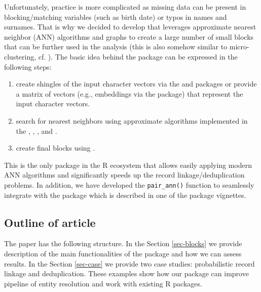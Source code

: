 Unfortunately, practice is more complicated as missing data can be
present in blocking/matching variables (such as birth date) or typos in
names and surnames. That is why we decided to develop 
that leverages approximate nearest neighbor (ANN) algorithms and graphs
to create a large number of small blocks that can be further used in the
analysis (this is also somehow similar to micro-clustering, cf.
\citet{johndrow2018theoretical}). The basic idea behind the 
package can be expressed in the following steps:

\begin{enumerate}
\def\labelenumi{\arabic{enumi}.}
\tightlist
\item
  create shingles of the input character vectors via the
   \citep{tokenizers} and 
  \citep{text2vec} packages or provide a matrix of vectors (e.g.,
  embeddings via the  \citep{ragnar} package) that
  represent the input character vectors.
\item
  search for nearest neighbors using approximate algorithms
  implemented in the  \citep{rnndescent},
   \citep{RcppHNSW},  \citep[
  \citet{mlpack2025}]{mlpack2023}, and  \citep{RcppAnnoy}.
\item
  create final blocks using  \citep[
  \citet{igraph2006}]{igraph2025}.
\end{enumerate}

This is the only package in the R ecosystem that allows easily applying
modern ANN algorithms and significantly speeds up the record
linkage/deduplication problems. In addition, we have developed the
\texttt{pair\_ann()} function to seamlessly integrate with the 
package which is described in one of the package vignettes.

\subsection{Outline of article}\label{outline-of-article}

The paper has the following structure. In the Section \ref{sec-blocks}
we provide description of the main functionalities of the 
package and how we can assess results. In the Section \ref{sec-case} we
provide two case studies: probabilistic record linkage and
deduplication. These examples show how our package can improve pipeline
of entity resolution and work with existing R packages.

